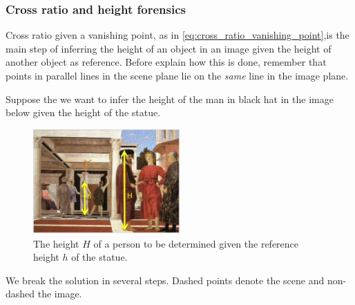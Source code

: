 \documentclass[a4paper]{article}
\begin{document}
\subsubsection{Cross ratio and height forensics}

Cross ratio given a vanishing point, as in \eqref{eq:cross_ratio_vanishing_point},is the main step of inferring the height of an object in an image given the height of another object as reference. Before explain how this is done, remember that points in parallel lines in the scene plane lie on the \textit{same} line in the image plane.

Suppose the we want to infer the height of the man in black hat in the image below given the height of the statue.

\begin{figure}[H]
    \centering
    \includegraphics[height=4cm]{img/metrology_painting_1.png}
    \caption{The height $H$ of a person to be determined given the reference height $h$ of the statue.}
\end{figure}

We break the solution in several steps. Dashed points denote the scene and non-dashed the image.
\end{document}
